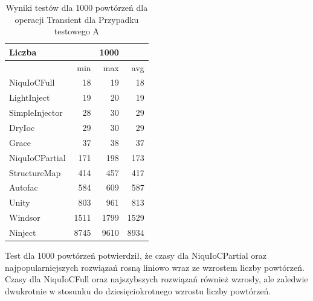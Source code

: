 \documentclass[12pt]{article}
\begin{document}
\begin{table}[H]
\captionsetup{belowskip=0pt,aboveskip=0pt}
\begin{center}
\begin{small}
	\begin{tabular}{ | l | r r r | }
    		\hline
Liczba & & 1000 & \\ \hline
 & min & max & avg \\ \hline
NiquIoCFull & 18 & 19 & 18 \\ \hline
LightInject & 19 & 20 & 19 \\ \hline
SimpleInjector & 28 & 30 & 29 \\ \hline
DryIoc & 29 & 30 & 29 \\ \hline
Grace & 37 & 38 & 37 \\ \hline
NiquIoCPartial & 171 & 198 & 173 \\ \hline
StructureMap & 414 & 457 & 417 \\ \hline
Autofac & 584 & 609 & 587 \\ \hline
Unity & 803 & 961 & 813 \\ \hline
Windsor & 1511 & 1799 & 1529 \\ \hline
Ninject & 8745 & 9610 & 8934 \\ \hline
  	\end{tabular}
\end{small}
\end{center}
\caption{Wyniki testów dla 1000 powtórzeń dla operacji Transient dla Przypadku testowego A}
\label{TestCaseA_Transient1000}
\end{table}
Test dla 1000 powtórzeń potwierdził, że czasy dla NiquIoCPartial oraz najpopularniejszych rozwiązań rosną liniowo wraz ze wzrostem liczby powtórzeń. Czasy dla NiquIoCFull oraz najszybszych rozwiązań również wzrosły, ale zaledwie dwukrotnie w stosunku do dziesięciokrotnego wzrostu liczby powtórzeń.
\end{document}

